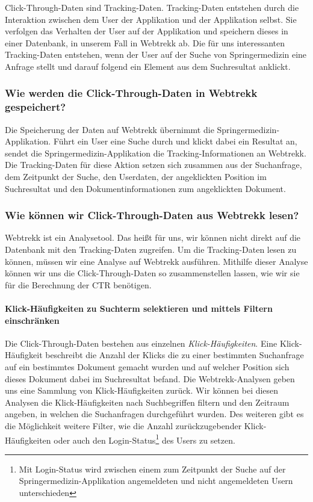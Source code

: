 Click-Through-Daten sind Tracking-Daten. Tracking-Daten entstehen durch die Interaktion zwischen dem User der Applikation und der Applikation selbst. Sie verfolgen das Verhalten der User auf der Applikation und speichern dieses in einer Datenbank, in unserem Fall in Webtrekk ab. Die für uns interessanten Tracking-Daten entstehen, wenn der User auf der Suche von Springermedizin eine Anfrage stellt und darauf folgend ein Element aus dem Suchresultat anklickt.

\subsubsection{Wie werden die Click-Through-Daten in Webtrekk gespeichert?}
\label{sec:Grundlagen:Grundbegriffe:Click-Through-Daten:SpeichernClick-Through-Daten}

Die Speicherung der Daten auf Webtrekk übernimmt die Springermedizin-Applikation. Führt ein User eine Suche durch und klickt dabei ein Resultat an, sendet die Springermedizin-Applikation die Tracking-Informationen an Webtrekk. Die Tracking-Daten für diese Aktion setzen sich zusammen aus der Suchanfrage, dem Zeitpunkt der Suche, den Userdaten, der angeklickten Position im Suchresultat und den Dokumentinformationen zum angeklickten Dokument.

\subsubsection{Wie können wir Click-Through-Daten aus Webtrekk lesen?}
\label{sec:Grundlagen:Grundbegriffe:Click-Through-Daten:LesenClick-Through-Daten}

Webtrekk ist ein Analysetool. Das heißt für uns, wir können nicht direkt auf die Datenbank mit den Tracking-Daten zugreifen. Um die Tracking-Daten lesen zu können, müssen wir eine Analyse auf Webtrekk ausführen. Mithilfe dieser Analyse können wir uns die Click-Through-Daten so zusammenstellen lassen, wie wir sie für die Berechnung der CTR benötigen.

\paragraph{Klick-Häufigkeiten zu Suchterm selektieren und mittels Filtern einschränken} 
Die Click-Through-Daten bestehen aus einzelnen \textit{Klick-Häufigkeiten}. Eine Klick-Häufigkeit beschreibt die Anzahl der Klicks die zu einer bestimmten Suchanfrage auf ein bestimmtes Dokument gemacht wurden und auf welcher Position sich dieses Dokument dabei im Suchresultat befand. Die Webtrekk-Analysen geben uns eine Sammlung von Klick-Häufigkeiten zurück. Wir können bei diesen Analysen die Klick-Häufigkeiten nach Suchbegriffen filtern und den Zeitraum angeben, in welchen die Suchanfragen durchgeführt wurden. Des weiteren gibt es die Möglichkeit weitere Filter, wie die Anzahl zurückzugebender Klick-Häufigkeiten oder auch den \glqq Login-Status\footnote{Mit Login-Status wird zwischen einem zum Zeitpunkt der Suche auf der Springermedizin-Applikation angemeldeten und nicht angemeldeten Usern unterschieden} des Users\grqq{} zu setzen. 

